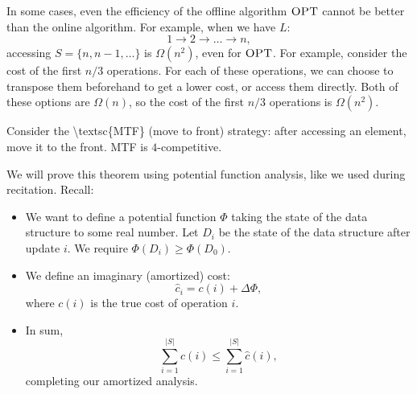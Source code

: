In some cases, even the efficiency of the offline algorithm $\textsc{OPT}$ cannot be better than the online algorithm. For example, when we have $L$:
\[1\longrightarrow 2\longrightarrow \hdots \longrightarrow n,\]
accessing $S = \{n, n-1, \hdots\}$ is $\Omega(n^2)$, even for $\textsc{OPT}$. For example, consider the cost of the first $n/3$ operations. For each of these operations, we can choose to transpose them beforehand to get a lower cost, or access them directly. Both of these options are $\Omega(n)$, so the cost of the first $n/3$ operations is $\Omega(n^2)$.

\begin{theorem}
\thmlabel

Consider the \ac{\textsc{MTF}} (move to front) strategy: after accessing an element, move it to the front. \textsc{MTF} is $4$-competitive. 
\end{theorem}

We will prove this theorem using potential function analysis, like we used during recitation. Recall:
\begin{itemize}
    \item We want to define a potential function $\Phi$ taking the state of the data structure to some real number. Let $D_i$ be the state of the data structure after update $i$. We require $\Phi(D_i)\geq \Phi(D_0)$.
    \item We define an imaginary (amortized) cost:
    \[\hat{c}_i = c(i) + \Delta \Phi,\]
    where $c(i)$ is the true cost of operation $i$.
    \item In sum, 
    \[\sum_{i=1}^{\vert S\vert}c(i)\leq \sum_{i=1}^{\vert S\vert}\hat{c}(i),\]
    completing our amortized analysis.
\end{itemize}

